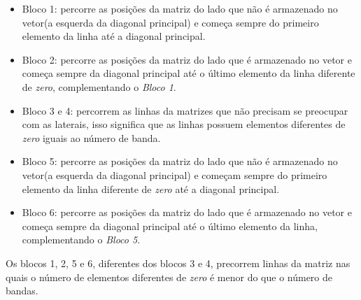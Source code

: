 \documentclass[12pt]{article}
\begin{document}
\begin{itemize}
\item Bloco 1: percorre as posições da matriz do lado que não é armazenado no vetor(a esquerda da diagonal principal) e começa sempre do primeiro elemento da linha até a diagonal principal.
\item Bloco 2: percorre as posições da matriz do lado que é armazenado no vetor e começa sempre da diagonal principal até o último elemento da linha diferente de \textit{zero}, complementando o \textit{Bloco 1}.
\item Bloco 3 e 4: percorrem as linhas da matrizes que não precisam se preocupar com as laterais, isso significa que as linhas possuem elementos diferentes de \textit{zero} iguais ao número de banda.
\item Bloco 5: percorre as posições da matriz do lado que não é armazenado no vetor(a esquerda da diagonal principal) e começam sempre do primeiro elemento da linha diferente de \textit{zero} até a diagonal principal.
\item Bloco 6: percorre as posições da matriz do lado que é armazenado no vetor e começa sempre da diagonal principal até o último elemento da linha, complementando o \textit{Bloco 5}.
\end{itemize}
Os blocos 1, 2, 5 e 6, diferentes dos blocos 3 e 4, precorrem linhas da matriz nas quais o número de elementos diferentes de \textit{zero} é menor do que o número de bandas.
\end{document}
